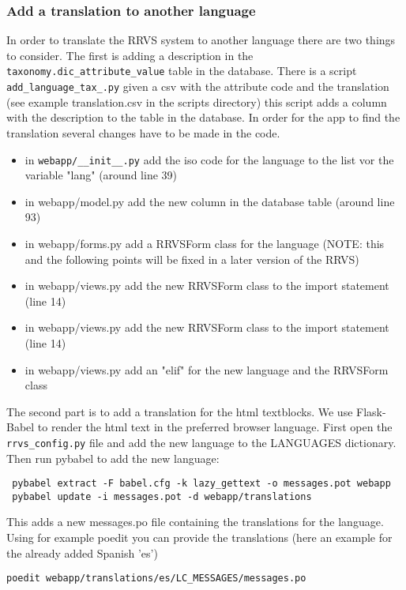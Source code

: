 \documentclass{article}
\begin{document}
\subsubsection{Add a translation to another language}
In order to translate the RRVS system to another language 
there are two things to consider. 
The first is adding a description in the \verb|taxonomy.dic_attribute_value| table in the database.
There is a script \verb|add_language_tax_.py|
given a csv with the attribute code and the translation (see example translation.csv in the scripts directory)
this script adds a column with the description to the table in the database.
In order for the app to find the translation several changes have to be made in the code.
\begin{itemize}
    \item in \verb|webapp/__init__.py| add the iso code for the language to the list vor the variable "lang" (around line 39)
    \item in webapp/model.py add the new column in the database table (around line 93)
    \item in webapp/forms.py add a RRVSForm class for the language (NOTE: this and the following points will be fixed in a later version of the RRVS)
    \item in webapp/views.py add the new RRVSForm class to the import statement (line 14)
    \item in webapp/views.py add the new RRVSForm class to the import statement (line 14)
    \item in webapp/views.py add an "elif" for the new language and the RRVSForm class
\end{itemize}

The second part is to add a translation for the html textblocks. We use Flask-Babel to render the html
text in the preferred browser language.
First open the \verb|rrvs_config.py| file and add the new language to the LANGUAGES dictionary.
Then run pybabel to add the new language:
\begin{verbatim}
 pybabel extract -F babel.cfg -k lazy_gettext -o messages.pot webapp
 pybabel update -i messages.pot -d webapp/translations
\end{verbatim}
This adds a new  messages.po file containing the translations for the language.
Using for example poedit you can provide the translations (here an example for the
already added Spanish 'es')
\begin{verbatim}
poedit webapp/translations/es/LC_MESSAGES/messages.po
\end{verbatim}
\end{document}

